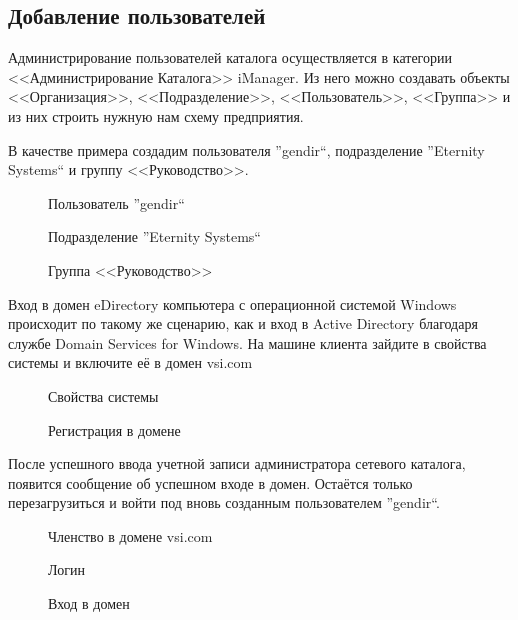 \subsection{Добавление пользователей}
Администрирование пользователей каталога осуществляется в категории <<Администрирование Каталога>> iManager. Из него можно создавать объекты <<Организация>>, <<Подразделение>>, <<Пользователь>>, <<Группа>> и из них строить нужную нам схему предприятия.\par
В качестве примера создадим пользователя ''gendir``, подразделение ''Eternity Systems`` и группу <<Руководство>>.

\begin{figure}[H]
\caption{Пользователь ''gendir``}
\end{figure}
\begin{figure}[H]
\caption{Подразделение ''Eternity Systems``}
\end{figure}
\begin{figure}[H]
\caption{Группа <<Руководство>>}
\end{figure}
\clearpage

Вход в домен eDirectory компьютера с операционной системой Windows происходит по такому же сценарию, как и вход в Active Directory благодаря службе Domain Services for Windows. На машине клиента зайдите в свойства системы и включите её в домен vsi.com
\begin{figure}[H]
\caption{Свойства системы}
\end{figure}
\begin{figure}[H]
\caption{Регистрация в домене}
\end{figure}
\clearpage

После успешного ввода учетной записи администратора сетевого каталога, появится сообщение об успешном входе в домен. Остаётся только перезагрузиться и войти под вновь созданным пользователем ''gendir``.
\begin{figure}[H]
\caption{Членство в домене vsi.com}
\end{figure}
\begin{figure}[H]
\caption{Логин}
\end{figure}
\begin{figure}[H]
\caption{Вход в домен}
\end{figure}


